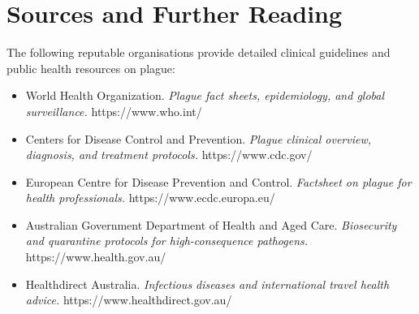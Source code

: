 \section*{Sources and Further Reading}
The following reputable organisations provide detailed clinical guidelines and public health resources on plague:
\begin{itemize}
    \item World Health Organization. \textit{Plague fact sheets, epidemiology, and global surveillance.} https://www.who.int/
    \item Centers for Disease Control and Prevention. \textit{Plague clinical overview, diagnosis, and treatment protocols.} https://www.cdc.gov/
    \item European Centre for Disease Prevention and Control. \textit{Factsheet on plague for health professionals.} https://www.ecdc.europa.eu/
    \item Australian Government Department of Health and Aged Care. \textit{Biosecurity and quarantine protocols for high-consequence pathogens.} https://www.health.gov.au/
    \item Healthdirect Australia. \textit{Infectious diseases and international travel health advice.} https://www.healthdirect.gov.au/
\end{itemize}

\clearpage
